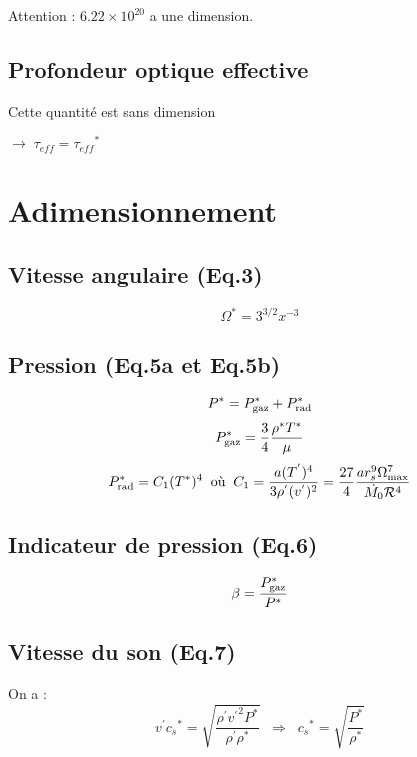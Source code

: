 \documentclass[a4paper,11pt]{article}
\begin{document}
Attention : $6.22 \times 10^{20}$ a une dimension.

\subsection{Profondeur optique effective}
    Cette quantité est sans dimension
    
    $\rightarrow \; \tau_{eff}={\tau_{eff}}^*$
    
\section{Adimensionnement}

\subsection{Vitesse angulaire (Eq.3)}
    \begin{equation}\label{vitesse_angulaire}
        \Omega^* = 3^{3/2} x^{-3}
    \end{equation}
    
\subsection{Pression (Eq.5a et Eq.5b)}
    \begin{equation}\label{pression_totale}
        P^* = P_{\rm{gaz}}^* + P_{\rm{rad}}^*
    \end{equation}
    \begin{equation}\label{pression_gaz}
        P_{\rm{gaz}}^* = \frac{3}{4} \frac{\rho^* T^*}{\mu}
    \end{equation}
    \begin{equation}\label{pression_rad}
        P_{\rm{rad}}^* = C_1 (T^*)^4 \;\; \textrm{où} \;\; C_1 = \frac{a (T^{'})^4}{3 \rho^{'} (v^{'})^2} =  \frac{27}{4} \frac{a r_s^9 \Omega_{\rm{max}}^7}{\dot{M_0} \mathcal{R}^4}
    \end{equation}
    
\subsection{Indicateur de pression (Eq.6)}
    \begin{equation}\label{indicateur_de_pression}
        \beta = \frac{P_{\rm{gaz}}^*}{P^*}
    \end{equation}

\subsection{Vitesse du son (Eq.7)}
On a :
\begin{equation}\label{vitesse_du_son}
   v^{'}{c_s}^*=\sqrt{\frac{\rho^{'}{v^{'}}^2P^*}{\rho^{'}\rho^*}}\;\; \Rightarrow \;\;{c_s}^*=\sqrt{\frac{P^*}{\rho^*}}
\end{equation}
\end{document}
